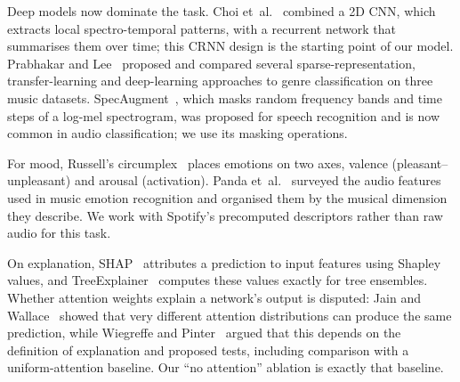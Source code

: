 \documentclass[conference]{IEEEtran}
\begin{document}
Deep models now dominate the task. Choi et~al.~\cite{choi2017} combined a 2D CNN, which extracts local spectro-temporal patterns, with a recurrent network that summarises them over time; this CRNN design is the starting point of our model. Prabhakar and Lee~\cite{prabhakar2023} proposed and compared several sparse-representation, transfer-learning and deep-learning approaches to genre classification on three music datasets. SpecAugment~\cite{park2019}, which masks random frequency bands and time steps of a log-mel spectrogram, was proposed for speech recognition and is now common in audio classification; we use its masking operations.

For mood, Russell's circumplex~\cite{russell1980} places emotions on two axes, valence (pleasant--unpleasant) and arousal (activation). Panda et~al.~\cite{panda2023} surveyed the audio features used in music emotion recognition and organised them by the musical dimension they describe. We work with Spotify's precomputed descriptors rather than raw audio for this task.

On explanation, SHAP~\cite{lundberg2017} attributes a prediction to input features using Shapley values, and TreeExplainer~\cite{lundberg2020} computes these values exactly for tree ensembles. Whether attention weights explain a network's output is disputed: Jain and Wallace~\cite{jain2019} showed that very different attention distributions can produce the same prediction, while Wiegreffe and Pinter~\cite{wiegreffe2019} argued that this depends on the definition of explanation and proposed tests, including comparison with a uniform-attention baseline. Our ``no attention'' ablation is exactly that baseline.
\end{document}
